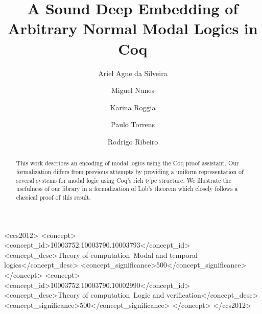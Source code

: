 \documentclass[sigconf]{acmart}
\begin{document}
\title{A Sound Deep Embedding of Arbitrary Normal Modal Logics in Coq}


\author{Ariel Agne da Silveira}

\author{Miguel Nunes}

\author{Karina Roggia}

\author{Paulo Torrens}

\author{Rodrigo Ribeiro}

\renewcommand{\shortauthors}{da Silveira et al.}

\begin{abstract}
  This work describes an encoding of modal logics using the Coq proof assistant.
  Our formalization differs from previous attempts by providing a uniform
  representation of several systems for modal logic using Coq's rich type
  structure. We illustrate the usefulness of our library in a formalization of
  L\"ob's theorem which closely follows a classical proof of this result.
\end{abstract}

\begin{CCSXML}
  <ccs2012>
    <concept>
        <concept_id>10003752.10003790.10003793</concept_id>
        <concept_desc>Theory of computation~Modal and temporal logics</concept_desc>
        <concept_significance>500</concept_significance>
        </concept>
    <concept>
        <concept_id>10003752.10003790.10002990</concept_id>
        <concept_desc>Theory of computation~Logic and verification</concept_desc>
        <concept_significance>500</concept_significance>
        </concept>
  </ccs2012>
\end{CCSXML}
\end{document}
